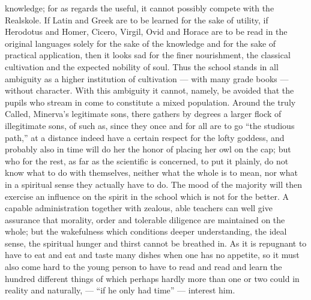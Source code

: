 \documentclass[12pt,a4paper,openany]{book}
\newcommand{\opage}[1]{\marginnote{\footnotesize\textit{[#1]}}}
\begin{document}
knowledge; for as regards the useful, it cannot
possibly compete with the Realskole. If Latin and Greek
are to be learned for the sake of utility, if Herodotus and Homer, Cicero,
Virgil, Ovid and Horace are to be read in the original languages
solely for the sake of the knowledge and for the sake of practical
application, then it looks sad for the finer
\setcounter{footnote}{0}%
\opage{308}nourishment, the classical cultivation and the expected nobility of soul.
Thus the school stands in all ambiguity as a
higher institution of cultivation --- with many grade books
--- without character. With this ambiguity it
cannot, namely, be avoided that the pupils who stream in
come to constitute a mixed population. Around
the truly Called, Minerva's legitimate sons, there gathers
by degrees a larger flock of illegitimate sons, of such
as, since they once and for all are to go ``the studious
path,'' at a distance indeed have a certain respect for the
lofty goddess, and probably also in time will do her
the honor of placing her owl on the cap; but
who for the rest, as far as the scientific is concerned, to put it plainly,
do not know what to do with themselves, neither what the whole
is to mean, nor what in a spiritual sense they actually
have to do. The mood of the majority will then exercise
an influence on the spirit in the school which is not for the
better. A capable administration together with zealous,
able teachers can well give assurance that morality,
order and tolerable diligence are maintained on the whole;
but the wakefulness which conditions deeper understanding,
the ideal sense, the spiritual hunger and thirst cannot
be breathed in. As it is repugnant to have to
eat and eat and taste many dishes when one has no
appetite, so it must also come hard to the young person
to have to read and read and learn the hundred
different things of which perhaps hardly more than one
or two could in reality and naturally, --- ``if
he only had time'' --- interest him.
\end{document}
